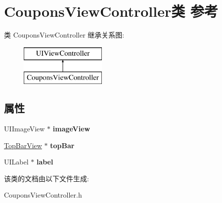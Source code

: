 \hypertarget{interface_coupons_view_controller}{\section{Coupons\-View\-Controller类 参考}
\label{interface_coupons_view_controller}
}
类 Coupons\-View\-Controller 继承关系图\-:\begin{figure}[H]
\begin{center}
\leavevmode
\includegraphics[height=2.000000cm]{interface_coupons_view_controller}
\end{center}
\end{figure}
\subsection*{属性}
\begin{DoxyCompactItemize}
\item 
\hypertarget{interface_coupons_view_controller_ae9bdd9bbac6cfdd5a892bc5baf99070c}{U\-I\-Image\-View $\ast$ {\bfseries image\-View}}\label{interface_coupons_view_controller_ae9bdd9bbac6cfdd5a892bc5baf99070c}

\item 
\hypertarget{interface_coupons_view_controller_acf56e6381638ed2faf61531be93508ea}{\hyperlink{interface_top_bar_view}{Top\-Bar\-View} $\ast$ {\bfseries top\-Bar}}\label{interface_coupons_view_controller_acf56e6381638ed2faf61531be93508ea}

\item 
\hypertarget{interface_coupons_view_controller_a00a649bc860adf51f6a3765ad81f2a0a}{U\-I\-Label $\ast$ {\bfseries label}}\label{interface_coupons_view_controller_a00a649bc860adf51f6a3765ad81f2a0a}

\end{DoxyCompactItemize}


该类的文档由以下文件生成\-:\begin{DoxyCompactItemize}
\item 
Coupons\-View\-Controller.\-h\end{DoxyCompactItemize}
